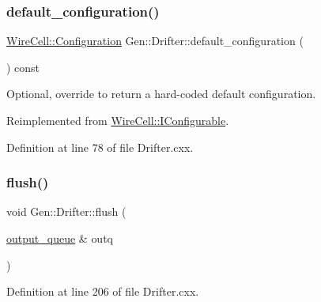 \subsubsection{\texorpdfstring{default\+\_\+configuration()}{default\_configuration()}}
{\footnotesize\ttfamily \hyperlink{namespace_wire_cell_a9f705541fc1d46c608b3d32c182333ee}{Wire\+Cell\+::\+Configuration} Gen\+::\+Drifter\+::default\+\_\+configuration (\begin{DoxyParamCaption}{ }\end{DoxyParamCaption}) const\hspace{0.3cm}{\ttfamily [virtual]}}



Optional, override to return a hard-\/coded default configuration. 



Reimplemented from \hyperlink{class_wire_cell_1_1_i_configurable_a54841b2da3d1ea02189478bff96f7998}{Wire\+Cell\+::\+I\+Configurable}.



Definition at line 78 of file Drifter.\+cxx.

\mbox{\label{class_wire_cell_1_1_gen_1_1_drifter_aaff6334fd86eabe10bad0d0efd28dcb2}} 
\subsubsection{\texorpdfstring{flush()}{flush()}}
{\footnotesize\ttfamily void Gen\+::\+Drifter\+::flush (\begin{DoxyParamCaption}\item[{\hyperlink{class_wire_cell_1_1_i_queuedout_node_a39018e4e3dd886befac9636ac791a685}{output\+\_\+queue} \&}]{outq }\end{DoxyParamCaption})}



Definition at line 206 of file Drifter.\+cxx.

